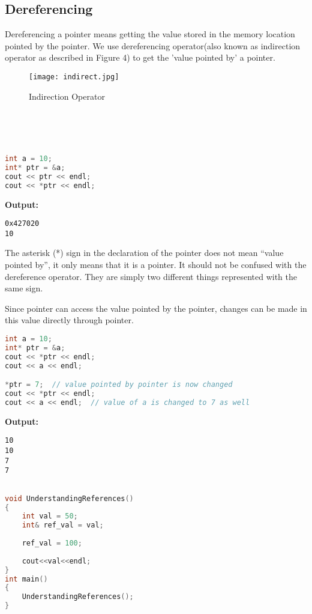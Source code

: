 \documentclass[11pt,fleqn]{book} %
\begin{document}
 \subsection{Dereferencing}
 Dereferencing a pointer means getting the value stored in the memory location pointed by the pointer.
 We use dereferencing operator(also known as indirection operator as described in Figure 4) to get the 'value pointed by' a pointer.
 \begin{figure}[h]
 	\centering\texttt{[image: indirect.jpg]}
 	\caption{Indirection Operator}
 \end{figure} \\ \\ \\

 \begin{lstlisting}[language=C++, caption = Dereferencing a pointer]
int a = 10;
int* ptr = &a; 
cout << ptr << endl;
cout << *ptr << endl; 
\end{lstlisting}
\textbf{Output:}
\begin{lstlisting}
0x427020
10
\end{lstlisting}

\begin{tcolorbox}[width=\textwidth,colback={white},title={KEYNOTE},colbacktitle=purple!50!white,coltitle=black] 
 	The asterisk (*) sign in the declaration of the pointer does not mean “value pointed by”, it only means that it is a pointer. It should not be confused with the dereference operator. They are simply two different things represented with the same sign.
\end{tcolorbox}
\hfill \break
Since pointer can access the value pointed by the pointer, changes can be made in this value directly through pointer.
\begin{lstlisting}[language=C++, caption = Modifying value of the address pointed by the pointer]
int a = 10;
int* ptr = &a; 
cout << *ptr << endl;
cout << a << endl;

*ptr = 7;  // value pointed by pointer is now changed
cout << *ptr << endl;
cout << a << endl;  // value of a is changed to 7 as well
\end{lstlisting}
\textbf{Output:} 
\begin{lstlisting}
10
10
7
7
\end{lstlisting}

\begin{example}
\begin{lstlisting}[language=C++, caption = Understanding Reference]

void UnderstandingReferences()
{
	int val = 50;
	int& ref_val = val;
	
	ref_val = 100;
	
	cout<<val<<endl;
}
int main()
{
	UnderstandingReferences();	
}
\end{lstlisting}
\end{example}
 
\end{document}
